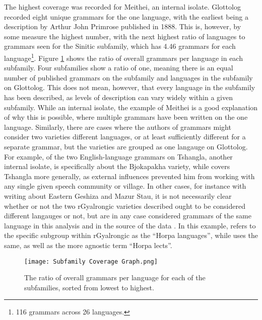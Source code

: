 The highest coverage was recorded for Meithei, an internal isolate. Glottolog recorded eight unique grammars for the one language, with the earliest being a description by Arthur John Primrose published in 1888\nocite{Primrose1888}. This is, however, by some measure the highest number, with the next highest ratio of languages to grammars seen for the Sinitic subfamily, which has 4.46 grammars for each language\footnote{116 grammars across 26 languages.}. Figure \ref{f:Description:SubfamilyCoverageGraph} shows the ratio of overall grammars per language in each subfamily. Four subfamilies show a ratio of one, meaning there is an equal number of published grammars on the subfamily and languages in the subfamily on Glottolog. This does not mean, however, that every language in the subfamily has been described, as levels of description can vary widely within a given subfamily. While an internal isolate, the example of Meithei is a good explanation of why this is possible, where multiple grammars have been written on the one language. Similarly, there are cases where the authors of grammars might consider two varieties different languages, or at least sufficiently different for a separate grammar, but the varieties are grouped as one langauge on Glottolog. For example, of the two English-language grammars on Tshangla, another internal isolate,  is specifically about the Bjokapakha variety, while  covers Tshangla more generally, as external influences prevented him from working with any single given speech community or village. In other cases, for instance with  writing about Eastern Geshiza and Mazur Stau, it is not necessarily clear whether or not the two rGyalrongic varieties described ought to be considered different langauges or not, but are in any case considered grammars of the same language in this analysis and in the source of the data \cite{glottolog}. In this example,  refers to the specific subgroup within rGyalrongic as the ``Horpa languages'', while  uses the same, as well as the more agnostic term ``Horpa lects''.

\begin{figure}
        \centering
        \texttt{[image: Subfamily Coverage Graph.png]}
        \caption{The ratio of overall grammars per language for each of the subfamilies, sorted from lowest to highest.}\label{f:Description:SubfamilyCoverageGraph}
\end{figure}

